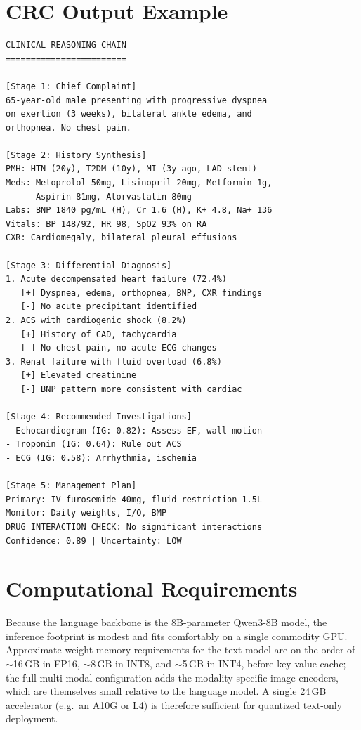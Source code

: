 \documentclass[11pt,a4paper]{article}
\begin{document}
\section{CRC Output Example}
\label{app:example}

\begin{lstlisting}[caption={Example CRC output for a clinical vignette},language={}]
CLINICAL REASONING CHAIN
========================

[Stage 1: Chief Complaint]
65-year-old male presenting with progressive dyspnea
on exertion (3 weeks), bilateral ankle edema, and
orthopnea. No chest pain.

[Stage 2: History Synthesis]
PMH: HTN (20y), T2DM (10y), MI (3y ago, LAD stent)
Meds: Metoprolol 50mg, Lisinopril 20mg, Metformin 1g,
      Aspirin 81mg, Atorvastatin 80mg
Labs: BNP 1840 pg/mL (H), Cr 1.6 (H), K+ 4.8, Na+ 136
Vitals: BP 148/92, HR 98, SpO2 93% on RA
CXR: Cardiomegaly, bilateral pleural effusions

[Stage 3: Differential Diagnosis]
1. Acute decompensated heart failure (72.4%)
   [+] Dyspnea, edema, orthopnea, BNP, CXR findings
   [-] No acute precipitant identified
2. ACS with cardiogenic shock (8.2%)
   [+] History of CAD, tachycardia
   [-] No chest pain, no acute ECG changes
3. Renal failure with fluid overload (6.8%)
   [+] Elevated creatinine
   [-] BNP pattern more consistent with cardiac

[Stage 4: Recommended Investigations]
- Echocardiogram (IG: 0.82): Assess EF, wall motion
- Troponin (IG: 0.64): Rule out ACS
- ECG (IG: 0.58): Arrhythmia, ischemia

[Stage 5: Management Plan]
Primary: IV furosemide 40mg, fluid restriction 1.5L
Monitor: Daily weights, I/O, BMP
DRUG INTERACTION CHECK: No significant interactions
Confidence: 0.89 | Uncertainty: LOW
\end{lstlisting}

\section{Computational Requirements}
\label{app:compute}

Because the language backbone is the 8B-parameter Qwen3-8B model, the inference footprint is modest and fits comfortably on a single commodity GPU. Approximate weight-memory requirements for the text model are on the order of $\sim$16\,GB in FP16, $\sim$8\,GB in INT8, and $\sim$5\,GB in INT4, before key-value cache; the full multi-modal configuration adds the modality-specific image encoders, which are themselves small relative to the language model. A single 24\,GB accelerator (e.g.\ an A10G or L4) is therefore sufficient for quantized text-only deployment.
\end{document}
